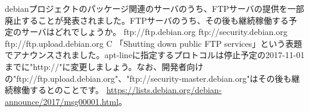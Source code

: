%

\santaku
{debianプロジェクトのパッケージ関連のサーバのうち、FTPサーバの提供を一部廃止することが発表されました。FTPサーバのうち、その後も継続稼働する予定のサーバはどれでしょうか。}
{ftp://ftp.debian.org}
{ftp://security.debian.org}
{ftp://ftp.upload.debian.org}
{C}
{「Shutting down public FTP services」という表題でアナウンスされました。apt-lineに指定するプロトコルは停止予定の2017-11-01までに"http://"に変更しましょう。なお、開発者向けの"ftp://ftp.upload.debian.org"、"ftp://security-master.debian.org"はその後も継続稼働するとのことです。 \url{https://lists.debian.org/debian-announce/2017/msg00001.html}。}
